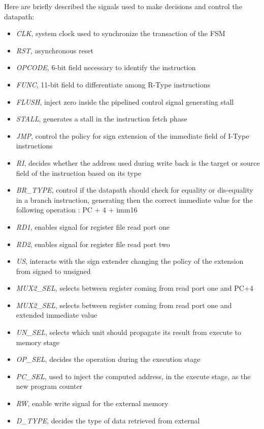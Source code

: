 Here are briefly described the signals used to make decisions and control
the datapath: 
\begin{itemize}
	\item \textit{CLK}, system clock used to synchronize the transaction of 
	      the FSM
	\item \textit{RST}, asynchronous reset 
	\item \textit{OPCODE}, 6-bit field necessary to identify the instruction
	\item \textit{FUNC}, 11-bit field to differentiate among R-Type instructions
	\item \textit{FLUSH}, inject zero inside the pipelined control signal
	      generating stall
	\item \textit{STALL}, generates a stall in the instruction fetch phase
	\item \textit{JMP}, control the policy for sign extension of the immediate 
		  field of I-Type instructions
	\item \textit{RI}, decides whether the address used during write back is
		  the target or source field of the instruction based on its type
	\item \textit{BR\_TYPE}, control if the datapath should check for equality
		  or dis-equality in a branch instruction, generating then the correct
		  immediate value for the following operation : PC + 4 + imm16
	\item \textit{RD1}, enables signal for register file read port one
	\item \textit{RD2}, enables signal for register file read port two
	\item \textit{US}, interacts with the sign extender changing the policy of 
		  the extension from signed to unsigned
	\item \textit{MUX2\_SEL}, selects between register coming from read port one
		  and PC+4
	\item \textit{MUX2\_SEL}, selects between register coming from read port one
		  and extended immediate value
	\item \textit{UN\_SEL}, selects which unit should propagate its result from 
		  execute to memory stage
	\item \textit{OP\_SEL}, decides the operation during the execution stage
	\item \textit{PC\_SEL}, used to inject the computed address, in the execute
	      stage, as the new program counter
	\item \textit{RW}, enable write signal for the external memory
	\item \textit{D\_TYPE}, decides the type of data retrieved from external

\end{itemize}
